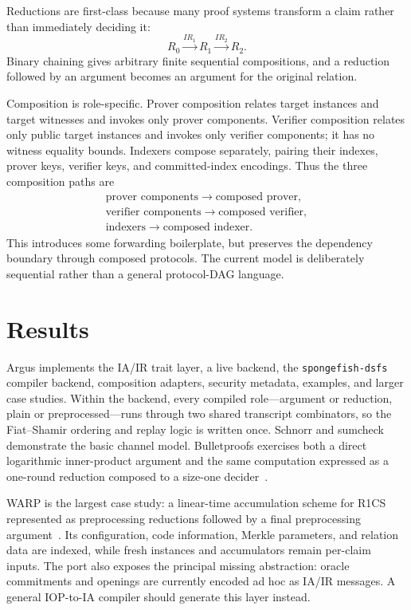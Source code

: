 \documentclass[11pt]{article}
\begin{document}
Reductions are first-class because many proof systems transform a claim rather
than immediately deciding it:
\[
    R_0 \xrightarrow{IR_1} R_1 \xrightarrow{IR_2} R_2.
\]
Binary chaining gives arbitrary finite sequential compositions, and a
reduction followed by an argument becomes an argument for the original
relation.

Composition is role-specific. Prover composition relates target instances and
target witnesses and invokes only prover components. Verifier composition
relates only public target instances and invokes only verifier components; it
has no witness equality bounds. Indexers compose separately, pairing their
indexes, prover keys, verifier keys, and committed-index encodings. Thus the
three composition paths are
\[
\begin{array}{c}
\text{prover components}\rightarrow\text{composed prover},\\
\text{verifier components}\rightarrow\text{composed verifier},\\
\text{indexers}\rightarrow\text{composed indexer}.
\end{array}
\]
This introduces some forwarding boilerplate, but preserves the dependency
boundary through composed protocols. The current model is deliberately
sequential rather than a general protocol-DAG language.

\section{Results}

Argus implements the IA/IR trait layer, a live backend, the
\texttt{spongefish-dsfs} compiler backend, composition adapters, security
metadata, examples, and larger case studies. Within the backend, every compiled
role---argument or reduction, plain or preprocessed---runs through two shared
transcript combinators, so the Fiat--Shamir ordering and replay logic is written
once. Schnorr and sumcheck demonstrate the basic channel model. Bulletproofs exercises both a direct logarithmic
inner-product argument and the same computation expressed as a one-round
reduction composed to a size-one decider~\cite{bulletproofs}.

WARP is the largest case study: a linear-time accumulation scheme for R1CS
represented as preprocessing reductions followed by a final preprocessing
argument~\cite{warp}. Its configuration, code information, Merkle parameters,
and relation data are indexed, while fresh instances and accumulators remain
per-claim inputs. The port also exposes the principal missing abstraction:
oracle commitments and openings are currently encoded ad hoc as IA/IR
messages. A general IOP-to-IA compiler should generate this layer instead.
\end{document}
